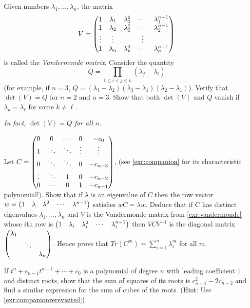 \documentclass{article}
\begin{document}
\begin{Exercise}\label{exr:vandermonde}
Given numbers \(\lambda_1,\ldots,\lambda_n\), the matrix \[V=\begin{pmatrix} 1 &
\lambda_1 & \lambda_1^2 & \cdots & \lambda_1^{n-1} \\ 1 & \lambda_2
& \lambda_2^2 & \cdots & \lambda_2^{n-1} \\ \vdots & \vdots & &
\vdots \\ 1 & \lambda_n & \lambda_n^2 & \cdots & \lambda_n^{n-1}
\end{pmatrix}\] is called the {\em Vandermonde matrix}. Consider the quantity
\[Q=\prod_{1\leq i<j\leq n}(\lambda_j-\lambda_i)\] (for example, if
\(n=3\),
\(Q=(\lambda_3-\lambda_2)(\lambda_3-\lambda_1)(\lambda_2-\lambda_1)\)). Verify
that \(\det(V)=Q\) for \(n=2\) and \(n=3\). Show that both
\(\det(V)\) and \(Q\) vanish if \(\lambda_k=\lambda_\ell\) for some
\(k\neq \ell\).


{\em In fact, \(\det(V)=Q\) for all \(n\).}
\end{Exercise}
\begin{Exercise}\label{exr:companionrerevisited}
Let \(C=\begin{pmatrix} 0 & 0 & \cdots & 0 & -c_0 \\ 1 & \ddots & \ddots &
\vdots & \vdots\\ 0 & \ddots & \ddots & 0 & -c_{n-3} \\ \vdots &
\ddots & 1 & 0 & -c_{n-2} \\ 0 & \cdots & 0 & 1 & -c_{n-1}\end{pmatrix}\),
(see \cref{exr:companion} for its characteristic polynomial!). Show
that if \(\lambda\) is an eigenvalue of \(C\) then the row vector
\(w=\begin{pmatrix} 1 & \lambda & \lambda^2 & \cdots & \lambda^{n-1}\end{pmatrix}\)
satisfies \(wC=\lambda w\). Deduce that if \(C\) has distinct
eigenvalues \(\lambda_1,\ldots,\lambda_n\) and \(V\) is the
Vandermonde matrix from \cref{exr:vandermonde} whose \(i\)th row is
\(\begin{pmatrix} 1 & \lambda_i & \lambda_i^2 & \cdots & \lambda_i^{n-1}\end{pmatrix}\)
then \(VCV^{-1}\) is the diagonal matrix \(\begin{pmatrix} \lambda_1 & & \\ &
\ddots & \\ & & \lambda_n\end{pmatrix}\). Hence prove that
\(Tr(C^m)=\sum_{i=1}^n\lambda_i^m\) for all \(m\).


\end{Exercise}
\begin{Exercise}\label{exr:coeffs}
If \(t^n+c_{n-1}t^{n-1}+\cdots+c_0\) is a polynomial of degree \(n\)
with leading coefficient \(1\) and distinct roots, show that the sum
of squares of its roots is \(c_{n-1}^2-2c_{n-2}\) and find a similar
expression for the sum of cubes of the roots. (Hint: Use
\cref{exr:companionrerevisited})


\end{Exercise}
\end{document}
